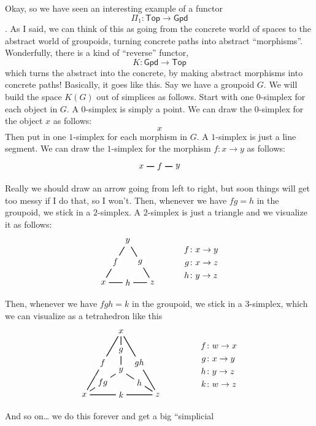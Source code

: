 \documentclass{article}
\begin{document}
Okay, so we have seen an interesting example of a functor
\[\Pi_1\colon\mathsf{Top}\to\mathsf{Gpd}\]. As I said, we can think of
this as going from the concrete world of spaces to the abstract world of
groupoids, turning concrete paths into abstract ``morphisms''.
Wonderfully, there is a kind of ``reverse'' functor,
\[K\colon\mathsf{Gpd}\to\mathsf{Top}\] which turns the abstract into the
concrete, by making abstract morphisms into concrete paths! Basically,
it goes like this. Say we have a groupoid \(G\). We will build the space
\(K(G)\) out of simplices as follows. Start with one 0-simplex for each
object in \(G\). A 0-simplex is simply a point. We can draw the
0-simplex for the object \(x\) as follows: \[x\] Then put in one
\(1\)-simplex for each morphism in \(G\). A \(1\)-simplex is just a line
segment. We can draw the \(1\)-simplex for the morphism
\(f\colon x\to y\) as follows: \[
  \begin{tikzpicture}
    \node (x) at (0,0) {$x$};
    \node (y) at (1.5,0) {$y$};
    \draw[thick] (x) to node[fill=white]{$f$} (y);
  \end{tikzpicture}
\] Really we should draw an arrow going from left to right, but soon
things will get too messy if I do that, so I won't. Then, whenever we
have \(fg=h\) in the groupoid, we stick in a \(2\)-simplex. A
\(2\)-simplex is just a triangle and we visualize it as follows: \[
  \begin{tikzpicture}
    \node (x) at (0,0) {$x$};
    \node (y) at (1,1.7) {$y$};
    \node (z) at (2,0) {$z$};
    \draw[thick] (x) to node[fill=white]{$f$} (y);
    \draw[thick] (x) to node[fill=white]{$h$} (z);
    \draw[thick] (y) to node[fill=white]{$g$} (z);
    \node at (4,0.8) {$
      \begin{aligned}
        f&\colon x\to y
      \\g&\colon x\to z
      \\h&\colon y\to z
      \end{aligned}
    $};
  \end{tikzpicture}
\] Then, whenever we have \(fgh = k\) in the groupoid, we stick in a
\(3\)-simplex, which we can visualize as a tetrahedron like this \[
  \begin{tikzpicture}
    \node (w) at (0,0) {$x$};
    \node (x) at (1.5,2.6,0) {$x$};
    \node (y) at (1.5,1) {$y$};
    \node (z) at (3,0) {$z$};
    \draw[thick] (w) to node[fill=white]{$f$} (x);
    \draw[thick] (x) to node[fill=white]{$g$} (y);
    \draw[thick] (y) to node[fill=white]{$h$} (z);
    \draw[thick] (w) to node[fill=white]{$k$} (z);
    \draw[thick] (w) to node[fill=white]{$fg$} (y);
    \draw[thick] (x) to node[fill=white]{$gh$} (z);
    \node at (5.5,1.2) {$
      \begin{aligned}
        f&\colon w\to x
      \\g&\colon x\to y
      \\h&\colon y\to z
      \\k&\colon w\to z
      \end{aligned}
    $};
  \end{tikzpicture}
\] And so on\ldots{} we do this forever and get a big ``simplicial
\end{document}
